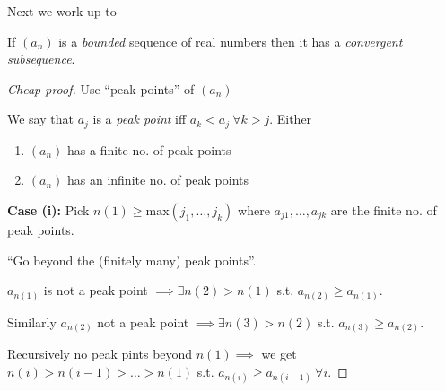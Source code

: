 Next we work up to 


\begin{theorem}
If $(a_n)$ is a \emph{bounded} sequence of real numbers then it has a \emph{convergent subsequence}.
\end{theorem}


\begin{proof}[Cheap proof]

Use ``peak points'' of $(a_n)$
\begin{center}
\end{center}

We say that $a_j$ is a \emph{peak point} iff $a_k < a_j ~\forall k > j$.
Either
\begin{enumerate}
	\item $(a_n)$ has a finite no. of peak points
	\item $(a_n)$ has an infinite no. of peak points
\end{enumerate}

\textbf{Case (i):} Pick $n(1) \geq \mathrm{max}(j_1,\dots,j_k)$ where $a_{j1},\dots,a_{jk}$ are the finite no. of peak points. 

``Go beyond the (finitely many) peak points''.

$a_{n(1)}$ is not a peak point $\implies \exists n(2) > n(1)$ s.t. $a_{n(2)} \geq a_{n(1)}$. 

Similarly $a_{n(2)}$ not a peak point $\implies \exists n(3) > n(2)$ s.t. $a_{n(3)} \geq a_{n(2)}$.

Recursively no peak pints beyond $n(1) \implies$ we get $n(i) > n(i-1) > \dots > n(1)$ s.t. $a_{n(i)} \geq a_{n(i-1)}~\forall i$.


\end{proof}
